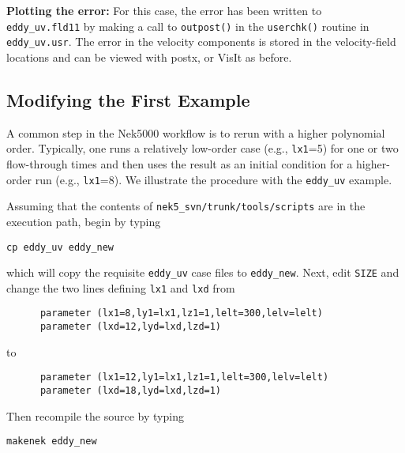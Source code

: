 {\bf Plotting the error:}
For this case, the error has been written to {\tt
eddy\_uv.fld11} by making a call to {\tt outpost()} in the {\tt userchk()}
routine in {\tt eddy\_uv.usr}.  The error in the velocity components
is stored in the velocity-field locations and can be viewed with 
postx, or VisIt as before.

\begin{comment}
through the following sequence: 
\begin{tabular}{r l l l}
  & {\bf click} \hspace*{1in} &{\bf type} \hspace*{1in} & {\bf comment} \\ \hline
1.& SET TIME         & 11 & load fld11 \\
2.& SET QUANTITY \\
3.& VELOCITY \\
4.& MAGNITUDE \\
5.& PLOT  \\
\end{tabular}
\end{comment}

\subsection{Modifying the First Example}

A common step in the Nek5000 workflow is to rerun with a higher
polynomial order.   Typically, one runs a relatively low-order case
(e.g., {\tt lx1}=5) for one or two flow-through times and then uses
the result as an initial condition for a higher-order run
(e.g., {\tt lx1}=8).  We illustrate the procedure with the 
{\tt eddy\_uv} example.

Assuming that the contents of {\tt nek5\_svn/trunk/tools/scripts}
are in the execution path, begin by typing
\begin{verbatim}
cp eddy_uv eddy_new
\end{verbatim}
which will copy the requisite {\tt eddy\_uv} case files
to {\tt eddy\_new}.  
Next, edit {\tt SIZE} and change the two lines defining
{\tt lx1} and {\tt lxd} from
\begin{verbatim}
      parameter (lx1=8,ly1=lx1,lz1=1,lelt=300,lelv=lelt)
      parameter (lxd=12,lyd=lxd,lzd=1)
\end{verbatim}
to
\begin{verbatim}
      parameter (lx1=12,ly1=lx1,lz1=1,lelt=300,lelv=lelt)
      parameter (lxd=18,lyd=lxd,lzd=1)
\end{verbatim}
Then recompile the source by typing
\begin{verbatim}
makenek eddy_new
\end{verbatim}

